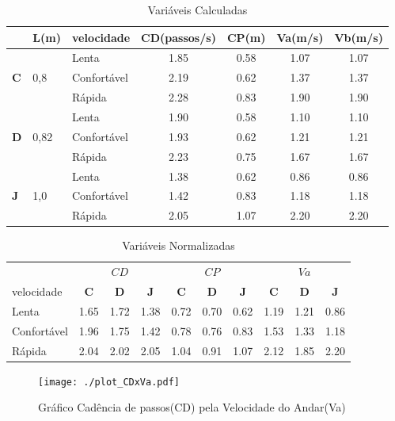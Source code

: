 \documentclass[a4paper,10pt]{article}
\begin{document}
\begin{table}
\begin{center}
\begin{tabular}{ll|lcccc}
&L(m)&velocidade & CD(passos/s) & CP(m) & Va(m/s) & Vb(m/s)\\
\hline
 & &Lenta & 1.85 & 0.58 & 1.07 & 1.07\\
\textbf{C}& 0,8&Confortável & 2.19 & 0.62 & 1.37 & 1.37\\
 & &Rápida & 2.28 & 0.83 & 1.90 & 1.90 \\
\hline
 & &Lenta & 1.90 & 0.58 & 1.10 & 1.10\\
\textbf{D}& 0,82&Confortável & 1.93 & 0.62 & 1.21 & 1.21\\
 & &Rápida & 2.23 & 0.75 & 1.67 & 1.67\\
\hline
 & &Lenta & 1.38 & 0.62 & 0.86 & 0.86\\
\textbf{J}& 1,0&Confortável & 1.42 & 0.83 & 1.18 & 1.18\\
 & &Rápida & 2.05 & 1.07 & 2.20 & 2.20\\
\end{tabular}
\end{center}
\caption{Variáveis Calculadas}
\label{tab_calculados}
\end{table}



\begin{table}
\begin{center}
\begin{tabular}{l|ccc|ccc|ccc}
& \multicolumn{3}{|c|}{$CD$} & \multicolumn{3}{|c}{$CP$} & \multicolumn{3}{|c}{$Va$}\\
velocidade & \textbf{C} & \textbf{D} & \textbf{J} & \textbf{C} & \textbf{D} & \textbf{J} & \textbf{C} & \textbf{D} & \textbf{J} \\ \hline
Lenta & 1.65 & 1.72 & 1.38 & 0.72 & 0.70 & 0.62 & 1.19 & 1.21 & 0.86\\
Confortável & 1.96 & 1.75 & 1.42 & 0.78 & 0.76 & 0.83 & 1.53 & 1.33 & 1.18\\
Rápida & 2.04 & 2.02 & 2.05 & 1.04 & 0.91 & 1.07 & 2.12 & 1.85 & 2.20
\end{tabular}
\end{center}

\caption{Variáveis Normalizadas}
\label{tab_norm}
\end{table}



\begin{figure}[h]
 \centering
 \texttt{[image: ./plot\_CDxVa.pdf]}
 \caption{Gráfico Cadência de passos(CD) pela Velocidade do Andar(Va)}
 \label{plotCDxVa}
\end{figure}
\end{document}
